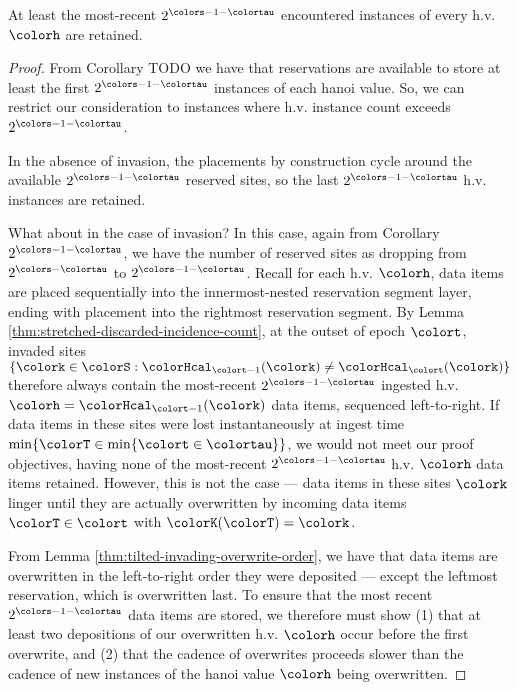 \begin{lemma}
\label{thm:tilted-most-recent-retained}
At least the most-recent $2^{\colors - 1 - \colortau}$ encountered instances of every h.v. $\colorh$ are retained.
\end{lemma}
\begin{proof}
From Corollary TODO we have that reservations are available to store at least the first $2^{\colors - 1 - \colortau}$ instances of each hanoi value.
So, we can restrict our consideration to instances where h.v. instance count exceeds $2^{\colors - 1 - \colortau}$.

In the absence of invasion, the placements by construction cycle around the available $2^{\colors - 1 - \colortau}$ reserved sites, so the last $2^{\colors - 1 - \colortau}$ h.v. instances are retained.

What about in the case of invasion?
In this case, again from Corollary $2^{\colors - 1 - \colortau}$, we have the number of reserved sites as dropping from $2^{\colors - \colortau}$ to $2^{\colors - 1 - \colortau}$.
Recall for each h.v. $\colorh$, data items are placed sequentially into the innermost-nested reservation segment layer, ending with placement into the rightmost reservation segment.
By Lemma \ref{thm:stretched-discarded-incidence-count}, at the outset of epoch $\colort$, invaded sites $\{\colork \in \colorS : \colorHcal_{\colort - 1}(\colork) \neq \colorHcal_{\colort}(\colork)\}$ therefore always contain the most-recent $2^{\colors - 1 - \colortau}$ ingested h.v. $\colorh = \colorHcal_{\colort - 1}(\colork)$ data items, sequenced left-to-right.
If data items in these sites were lost instantaneously at ingest time $\min\{\colorT \in \min\{\colort \in \colortau\}\}$, we would not meet our proof objectives, having none of the most-recent $2^{\colors - 1 - \colortau}$ h.v. $\colorh$ data items retained.
However, this is not the case --- data items in these sites $\colork$ linger until they are actually overwritten by incoming data items $\colorT \in \colort$ with $\colorK(\colorT) = \colork$.

From Lemma \ref{thm:tilted-invading-overwrite-order}, we have that data items are overwritten in the left-to-right order they were deposited --- except the leftmost reservation, which is overwritten last.
To ensure that the most recent $2^{\colors - 1 - \colortau}$ data items are stored, we therefore must show (1) that at least two depositions of our overwritten h.v. $\colorh$ occur before the first overwrite, and (2) that the cadence of overwrites proceeds slower than the cadence of new instances of the hanoi value $\colorh$ being overwritten.


\end{proof}
